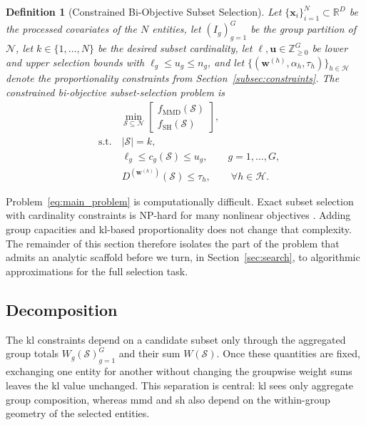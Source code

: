 \documentclass[10pt,journal]{IEEEtran}
\newcommand{\R}{\mathbb{R}}
\newcommand{\1}{\mathbf{1}}
\newcommand{\bx}{\mathbf{x}}
\newcommand{\bw}{\mathbf{w}}
\newcommand{\Sel}{\mathcal{S}}
\theoremstyle{ieeethm}
\newtheorem{definition}{Definition}
\begin{document}
\begin{definition}[Constrained Bi-Objective Subset Selection]
\label{def:main_problem}
Let $\{\bx_i\}_{i=1}^N\subset\R^D$ be the processed covariates of the $N$ entities, let $(I_g)_{g=1}^G$ be the group partition of $\mathcal{N}$, let $k\in\{1,\dots,N\}$ be the desired subset cardinality, let $\boldsymbol{\ell},\mathbf u\in\mathbb{Z}_{\ge 0}^G$ be lower and upper selection bounds with $\ell_g\le u_g\le n_g$, and let $\{(\bw^{(h)},\alpha_h,\tau_h)\}_{h\in\mathcal{H}}$ denote the proportionality constraints from Section~\ref{subsec:constraints}. The constrained bi-objective subset-selection problem is
\begin{equation}
\label{eq:main_problem}
\begin{aligned}
&\mspace{40mu}\min_{\Sel\subseteq\mathcal{N}}
\begin{bmatrix}
f_{\mathrm{MMD}}(\Sel)\\
f_{\mathrm{SH}}(\Sel)
\end{bmatrix},
\\[1.5ex]
&\text{s.t.}\quad |\Sel|=k,
\\
&\phantom{\text{s.t.}\quad}\ell_g\le c_g(\Sel)\le u_g,\qquad g=1,\dots,G,
\\
&\phantom{\text{s.t.}\quad}D^{(\bw^{(h)})}(\Sel)\le \tau_h,\qquad \forall h\in\mathcal{H}.
\end{aligned}
\end{equation}
\end{definition}

Problem~\eqref{eq:main_problem} is computationally difficult. Exact subset selection with cardinality constraints is NP-hard for many nonlinear objectives \cite{garey1979np,pardalos1991qp}. Adding group capacities and \gls{kl}-based proportionality does not change that complexity. The remainder of this section therefore isolates the part of the problem that admits an analytic scaffold before we turn, in Section~\ref{sec:search}, to algorithmic approximations for the full selection task.

\subsection{ Decomposition}
\label{subsec:kl_decomp}

The \gls{kl} constraints depend on a candidate subset only through the aggregated group totals ${W_g(\Sel)}_{g=1}^{G}$ and their sum $W(\Sel)$. Once these quantities are fixed, exchanging one entity for another without changing the groupwise weight sums leaves the \gls{kl} value unchanged. This separation is central: \gls{kl} sees only aggregate group composition, whereas \gls{mmd} and \gls{sh} also depend on the within-group geometry of the selected entities.
\end{document}
